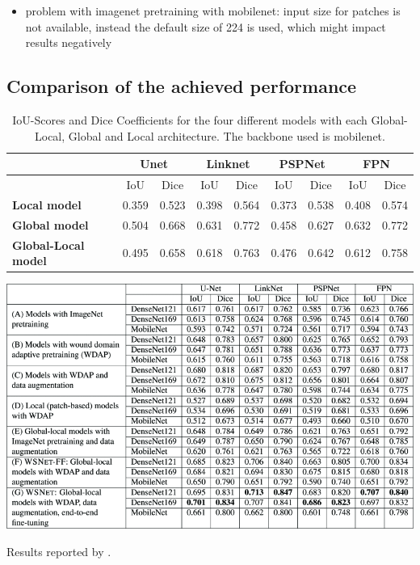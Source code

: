 \begin{itemize}
	\item problem with imagenet pretraining with mobilenet: input size for patches is not available, instead the default size of 224 is used, which might impact results negatively
\end{itemize}


\subsection{Comparison of the achieved performance}

\begin{table}[htb!]
	\centering
	\begin{tabular}{l||c | c | c | c | c | c | c | c|}
	& \multicolumn{2}{|c|}{Unet} & \multicolumn{2}{|c|}{Linknet} & \multicolumn{2}{|c|}{PSPNet} & \multicolumn{2}{|c|}{FPN} \\
	\hline
	& IoU & Dice & IoU & Dice & IoU & Dice & IoU & Dice \\
	\hline\hline
	\textbf{Local model} & 0.359 & 0.523 & 0.398 & 0.564 & 0.373 & 0.538 & 0.408 & 0.574 \\	
	\textbf{Global model} & 0.504 & 0.668 & 0.631 & 0.772 & 0.458 & 0.627 & 0.632 & 0.772 \\
	\textbf{Global-Local model} & 0.495 & 0.658 & 0.618 & 0.763 & 0.476 & 0.642 & 0.612 & 0.758\\
	\end{tabular}
	\caption{IoU-Scores and Dice Coefficients for the four different models with each Global-Local, Global and Local architecture. The backbone used is mobilenet.}
\end{table}

\begin{table}[htb!]
	\centering
	\includegraphics[width=\textwidth]{fig/wsnet-results.png}
	\caption{Results reported by \citeauthor{Oota_2023_WACV} \cite{Oota_2023_WACV}.}
\end{table}

